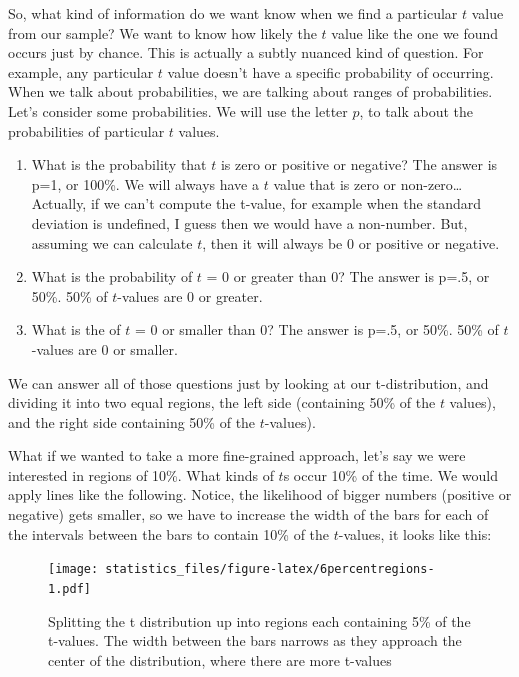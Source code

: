 \documentclass[]{book}
\begin{document}
So, what kind of information do we want know when we find a particular \(t\) value from our sample? We want to know how likely the \(t\) value like the one we found occurs just by chance. This is actually a subtly nuanced kind of question. For example, any particular \(t\) value doesn't have a specific probability of occurring. When we talk about probabilities, we are talking about ranges of probabilities. Let's consider some probabilities. We will use the letter \(p\), to talk about the probabilities of particular \(t\) values.

\begin{enumerate}
\def\labelenumi{\arabic{enumi}.}
\item
  What is the probability that \(t\) is zero or positive or negative? The answer is p=1, or 100\%. We will always have a \(t\) value that is zero or non-zero\ldots{}Actually, if we can't compute the t-value, for example when the standard deviation is undefined, I guess then we would have a non-number. But, assuming we can calculate \(t\), then it will always be 0 or positive or negative.
\item
  What is the probability of \(t\) = 0 or greater than 0? The answer is p=.5, or 50\%. 50\% of \(t\)-values are 0 or greater.
\item
  What is the of \(t\) = 0 or smaller than 0? The answer is p=.5, or 50\%. 50\% of \(t\)-values are 0 or smaller.
\end{enumerate}

We can answer all of those questions just by looking at our t-distribution, and dividing it into two equal regions, the left side (containing 50\% of the \(t\) values), and the right side containing 50\% of the \(t\)-values).

What if we wanted to take a more fine-grained approach, let's say we were interested in regions of 10\%. What kinds of \(t\)s occur 10\% of the time. We would apply lines like the following. Notice, the likelihood of bigger numbers (positive or negative) gets smaller, so we have to increase the width of the bars for each of the intervals between the bars to contain 10\% of the \(t\)-values, it looks like this:

\begin{figure}
\centering
\texttt{[image: statistics\_files/figure-latex/6percentregions-1.pdf]}
\caption{\label{fig:6percentregions}Splitting the t distribution up into regions each containing 5\% of the t-values. The width between the bars narrows as they approach the center of the distribution, where there are more t-values}
\end{figure}
\end{document}
